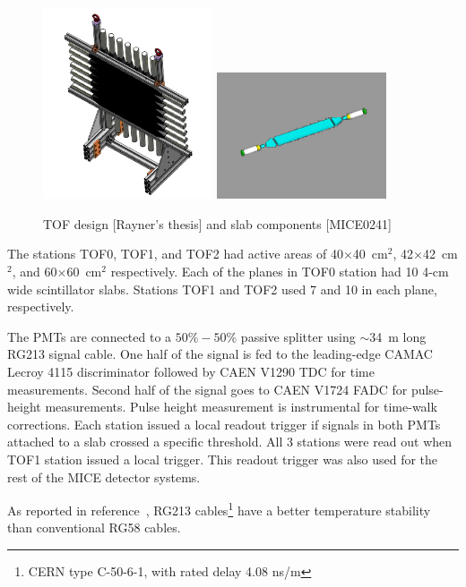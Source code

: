 \begin{figure}[!ht]
  \centering
  \includegraphics[width=5cm]{tof_diagram}
  \includegraphics[width=5cm]{slab_design}
  \caption{TOF design [Rayner's thesis] and slab components [MICE0241]}
  \label{fig:tof:schematic}
\end{figure}

The stations TOF0, TOF1, and TOF2 had active areas of
40$\times$40~cm$^2$, 42$\times$42~cm$^2$, and 60$\times$60~cm$^2$
respectively.  Each of the planes in TOF0 station had 10 4-cm wide
scintillator slabs. Stations TOF1 and TOF2 used 7 and
10 in each plane, respectively.

The PMTs are connected to a $50\%-50\%$ passive splitter using
$\sim$34~m long RG213 signal cable. One half of the signal is fed to
the leading-edge CAMAC Lecroy 4115 discriminator followed by CAEN
V1290 TDC for time measurements. Second half of the signal goes to
CAEN V1724 FADC for pulse-height measurements. Pulse height
measurement is instrumental for time-walk corrections. Each station
issued a local readout trigger if signals in both PMTs attached to a
slab crossed a specific threshold. All 3 stations were read out when
TOF1 station issued a local trigger. This readout trigger was also
used for the rest of the MICE detector systems.




 As reported in
reference~\cite{NOTE241}, RG213 cables\footnote{CERN type C-50-6-1,
  with rated delay 4.08 ns/m} have a better temperature stability than
conventional RG58 cables.

